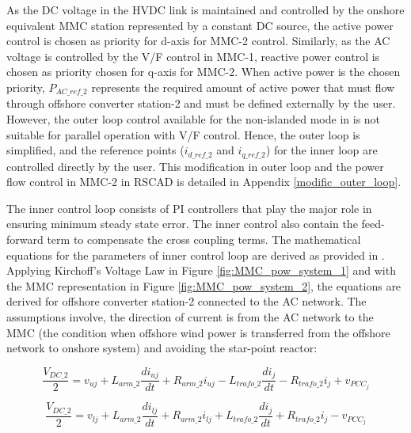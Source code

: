 As the \gls{DC} voltage in the \gls{HVDC} link is maintained and controlled by the onshore equivalent \gls{MMC} station represented by a constant \gls{DC} source, the active power control is chosen as priority for d-axis for \gls{MMC}-2 control. Similarly, as the \gls{AC} voltage is controlled by the V/F control in \gls{MMC}-1, reactive power control is chosen as priority chosen for q-axis for \gls{MMC}-2. When active power is the chosen priority, $P_{AC\_ref\_2}$ represents the required amount of active power that must flow through offshore converter station-2 and must be defined externally by the user. However, the outer loop control available for the non-islanded mode in \cite{vrana2013cigre} is not suitable for parallel operation with V/F control. Hence, the outer loop is simplified, and the reference points ($i_{d\_ref\_2}$ and $i_{q\_ref\_2}$) for the inner loop are controlled directly by the user. This modification in outer loop and the power flow control in \gls{MMC}-2 in RSCAD is detailed in Appendix \ref{modific_outer_loop}.  





The inner control loop consists of \gls{PI} controllers that play the major role in ensuring minimum steady state error. The inner control also contain the feed-forward term to compensate the cross coupling terms. The mathematical equations for the parameters of inner control loop are derived as provided in \cite{saad2015modelisation}. Applying Kirchoff's Voltage Law in Figure \ref{fig:MMC_pow_system_1} and with the \gls{MMC} representation in Figure \ref{fig:MMC_pow_system_2}, the equations are derived for offshore converter station-2 connected to the \gls{AC} network. The assumptions involve, the direction of current is from the \gls{AC} network to the \gls{MMC} (the condition when offshore wind power is transferred from the offshore network to onshore system) and avoiding the star-point reactor:

\begin{equation}
    \frac{V_{DC\_2}}{2} = v_{uj} + L_{arm\_2}\frac{di_{uj}}{dt} + R_{arm\_2}i_{uj} - L_{trafo\_2}\frac{di_{j}}{dt} - R_{trafo\_2}i_j + v_{PCC_j}
\end{equation}

\begin{equation}
    \frac{V_{DC\_2}}{2} = v_{lj} + L_{arm\_2}\frac{di_{lj}}{dt} + R_{arm\_2}i_{lj} + L_{trafo\_2}\frac{di_{j}}{dt} + R_{trafo\_2}i_j - v_{PCC_j}
\end{equation}

